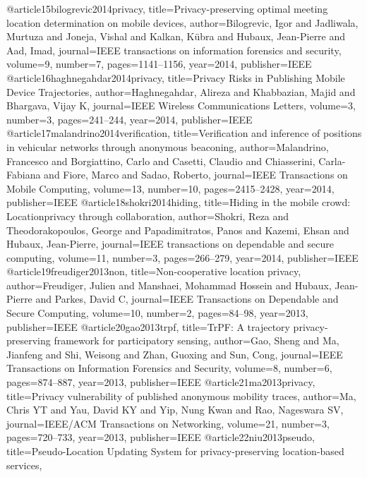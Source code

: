 {{{{{{{{@article{15bilogrevic2014privacy,
  title={Privacy-preserving optimal meeting location determination on mobile devices},
  author={Bilogrevic, Igor and Jadliwala, Murtuza and Joneja, Vishal and Kalkan, K{\"u}bra and Hubaux, Jean-Pierre and Aad, Imad},
  journal={IEEE transactions on information forensics and security},
  volume={9},
  number={7},
  pages={1141--1156},
  year={2014},
  publisher={IEEE}
}
@article{16haghnegahdar2014privacy,
  title={Privacy Risks in Publishing Mobile Device Trajectories},
  author={Haghnegahdar, Alireza and Khabbazian, Majid and Bhargava, Vijay K},
  journal={IEEE Wireless Communications Letters},
  volume={3},
  number={3},
  pages={241--244},
  year={2014},
  publisher={IEEE}
}
@article{17malandrino2014verification,
  title={Verification and inference of positions in vehicular networks through anonymous beaconing},
  author={Malandrino, Francesco and Borgiattino, Carlo and Casetti, Claudio and Chiasserini, Carla-Fabiana and Fiore, Marco and Sadao, Roberto},
  journal={IEEE Transactions on Mobile Computing},
  volume={13},
  number={10},
  pages={2415--2428},
  year={2014},
  publisher={IEEE}
}
@article{18shokri2014hiding,
  title={Hiding in the mobile crowd: Locationprivacy through collaboration},
  author={Shokri, Reza and Theodorakopoulos, George and Papadimitratos, Panos and Kazemi, Ehsan and Hubaux, Jean-Pierre},
  journal={IEEE transactions on dependable and secure computing},
  volume={11},
  number={3},
  pages={266--279},
  year={2014},
  publisher={IEEE}
}
@article{19freudiger2013non,
  title={Non-cooperative location privacy},
  author={Freudiger, Julien and Manshaei, Mohammad Hossein and Hubaux, Jean-Pierre and Parkes, David C},
  journal={IEEE Transactions on Dependable and Secure Computing},
  volume={10},
  number={2},
  pages={84--98},
  year={2013},
  publisher={IEEE}
}
@article{20gao2013trpf,
  title={TrPF: A trajectory privacy-preserving framework for participatory sensing},
  author={Gao, Sheng and Ma, Jianfeng and Shi, Weisong and Zhan, Guoxing and Sun, Cong},
  journal={IEEE Transactions on Information Forensics and Security},
  volume={8},
  number={6},
  pages={874--887},
  year={2013},
  publisher={IEEE}
}
@article{21ma2013privacy,
  title={Privacy vulnerability of published anonymous mobility traces},
  author={Ma, Chris YT and Yau, David KY and Yip, Nung Kwan and Rao, Nageswara SV},
  journal={IEEE/ACM Transactions on Networking},
  volume={21},
  number={3},
  pages={720--733},
  year={2013},
  publisher={IEEE}
}
@article{22niu2013pseudo,
  title={Pseudo-Location Updating System for privacy-preserving location-based services},
}}}}}}}}}
